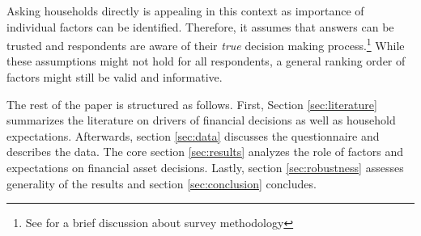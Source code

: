 \documentclass[ProjectABM]{subfiles}
\begin{document}
Asking households directly is appealing in this context as importance of individual factors can be identified. Therefore, it assumes that answers can be trusted and respondents are aware of their \textit{true} decision making process.\footnote{See \cite{choi_2020} for a brief discussion about survey methodology} While these assumptions might not hold for all respondents, a general ranking order of factors might still be valid and informative.



The rest of the paper is structured as follows. First, Section \ref{sec:literature} summarizes the literature on drivers of financial decisions as well as household expectations. Afterwards, section \ref{sec:data} discusses the questionnaire and describes the data. The core section \ref{sec:results} analyzes the role of factors and expectations on financial asset decisions. Lastly, section \ref{sec:robustness} assesses generality of the results and section \ref{sec:conclusion} concludes.
\end{document}

